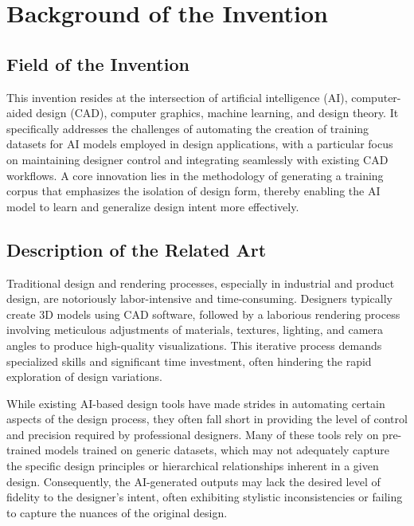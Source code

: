 \documentclass{article}
\begin{document}
\section{Background of the Invention}

\subsection{Field of the Invention}

This invention resides at the intersection of artificial intelligence (AI), computer-aided design (CAD), computer graphics, machine learning, and design theory. It specifically addresses the challenges of automating the creation of training datasets for AI models employed in design applications, with a particular focus on maintaining designer control and integrating seamlessly with existing CAD workflows. A core innovation lies in the methodology of generating a training corpus that emphasizes the isolation of design form, thereby enabling the AI model to learn and generalize design intent more effectively.



\subsection{Description of the Related Art}

Traditional design and rendering processes, especially in industrial and product design, are notoriously labor-intensive and time-consuming. Designers typically create 3D models using CAD software, followed by a laborious rendering process involving meticulous adjustments of materials, textures, lighting, and camera angles to produce high-quality visualizations. This iterative process demands specialized skills and significant time investment, often hindering the rapid exploration of design variations.

While existing AI-based design tools have made strides in automating certain aspects of the design process, they often fall short in providing the level of control and precision required by professional designers. Many of these tools rely on pre-trained models trained on generic datasets, which may not adequately capture the specific design principles or hierarchical relationships inherent in a given design. Consequently, the AI-generated outputs may lack the desired level of fidelity to the designer's intent, often exhibiting stylistic inconsistencies or failing to capture the nuances of the original design.
\end{document}
